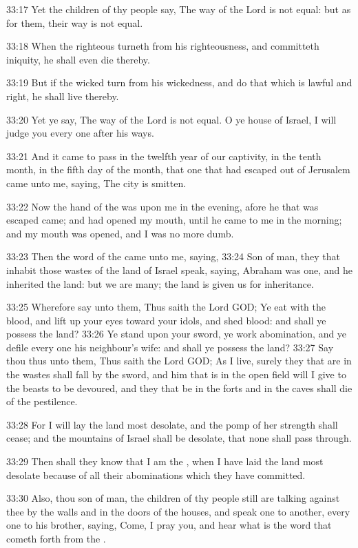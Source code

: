33:17 Yet the children of thy people say, The way of the Lord is not
equal: but as for them, their way is not equal.

33:18 When the righteous turneth from his righteousness, and
committeth iniquity, he shall even die thereby.

33:19 But if the wicked turn from his wickedness, and do that which is
lawful and right, he shall live thereby.

33:20 Yet ye say, The way of the Lord is not equal. O ye house of
Israel, I will judge you every one after his ways.

33:21 And it came to pass in the twelfth year of our captivity, in the
tenth month, in the fifth day of the month, that one that had escaped
out of Jerusalem came unto me, saying, The city is smitten.

33:22 Now the hand of the \LORD was upon me in the evening, afore he
that was escaped came; and had opened my mouth, until he came to me in
the morning; and my mouth was opened, and I was no more dumb.

33:23 Then the word of the \LORD came unto me, saying, 33:24 Son of
man, they that inhabit those wastes of the land of Israel speak,
saying, Abraham was one, and he inherited the land: but we are many;
the land is given us for inheritance.

33:25 Wherefore say unto them, Thus saith the Lord GOD; Ye eat with
the blood, and lift up your eyes toward your idols, and shed blood:
and shall ye possess the land?  33:26 Ye stand upon your sword, ye
work abomination, and ye defile every one his neighbour's wife: and
shall ye possess the land?  33:27 Say thou thus unto them, Thus saith
the Lord GOD; As I live, surely they that are in the wastes shall fall
by the sword, and him that is in the open field will I give to the
beasts to be devoured, and they that be in the forts and in the caves
shall die of the pestilence.

33:28 For I will lay the land most desolate, and the pomp of her
strength shall cease; and the mountains of Israel shall be desolate,
that none shall pass through.

33:29 Then shall they know that I am the \LORD, when I have laid the
land most desolate because of all their abominations which they have
committed.

33:30 Also, thou son of man, the children of thy people still are
talking against thee by the walls and in the doors of the houses, and
speak one to another, every one to his brother, saying, Come, I pray
you, and hear what is the word that cometh forth from the \LORD.

